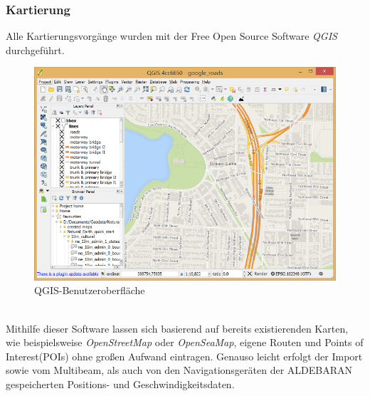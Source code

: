 \subsubsection{Kartierung}
Alle Kartierungsvorgänge wurden mit der Free Open Source Software \emph{QGIS}\cite{qgis}\\durchgeführt.
\begin{figure}[ht]
    \centering
    \includegraphics[width=.5\linewidth]{Bilder/QGIS/about-screenshot.png}
    \caption[fig:qgisabout]{QGIS-Benutzeroberfläche}
\end{figure}
\\Mithilfe dieser Software lassen sich basierend auf bereits existierenden Karten, 
wie beispielsweise \emph{OpenStreetMap}\cite{ostrm} oder \emph{OpenSeaMap}\cite{oseam}, eigene Routen und Points of \\Interest(POIs) ohne großen 
Aufwand eintragen. Genauso leicht erfolgt der Import sowie vom Multibeam,  als auch von den Navigationsgeräten der ALDEBARAN gespeicherten 
Positions-  und Geschwindigkeitsdaten.
